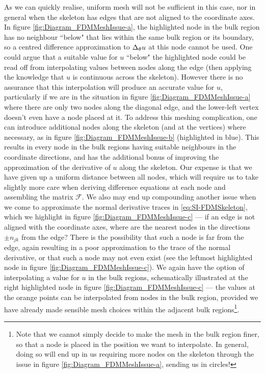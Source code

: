 As we can quickly realise, uniform mesh will not be sufficient in this case, nor in general when the skeleton has edges that are not aligned to the coordinate axes. 
In figure \ref{fig:Diagram_FDMMeshIssue-a}, the highlighted node in the bulk region has no neighbour ``below" that lies within the same bulk region or its boundary, so a centred difference approximation to $\Delta_{\theta}u$ at this node cannot be used.
One could argue that a suitable value for $u$ ``below" the highlighted node could be read off from interpolating values between nodes along the edge (then applying the knowledge that $u$ is continuous across the skeleton).
However there is no assurance that this interpolation will produce an accurate value for $u$, particularly if we are in the situation in figure \ref{fig:Diagram_FDMMeshIssue-a} where there are only two nodes along the diagonal edge, and the lower-left vertex doesn't even have a node placed at it.
To address this meshing complication, one can introduce additional nodes along the skeleton (and at the vertices) where necessary, as in figure \ref{fig:Diagram_FDMMeshIssue-b} (highlighted in blue).
This results in every node in the bulk regions having suitable neighbours in the coordinate directions, and has the additional bonus of improving the approximation of the derivative of $u$ along the skeleton.
Our expense is that we have given up a uniform distance between all nodes, which will require us to take slightly more care when deriving difference equations at each node and assembling the matrix $\mathcal{F}$.
We also may end up compounding another issue when we come to approximate the normal derivative traces in \eqref{eq:SI-FDMSkeleton}, which we highlight in figure \ref{fig:Diagram_FDMMeshIssue-c} --- if an edge is not aligned with the coordinate axes, where are the nearest nodes in the directions $\pm n_{jk}$ from the edge?
There is the possibility that such a node is far from the edge, again resulting in a poor approximation to the trace of the normal derivative, or that such a node may not even exist (see the leftmost highlighted node in figure \ref{fig:Diagram_FDMMeshIssue-c}).
We again have the option of interpolating a value for $u$ in the bulk regions, schematically illustrated at the right highlighted node in figure \ref{fig:Diagram_FDMMeshIssue-c} --- the values at the orange points can be interpolated from nodes in the bulk region, provided we have already made sensible mesh choices within the adjacent bulk regions\footnote{Note that we cannot simply decide to make the mesh in the bulk region finer, so that a node is placed in the position we want to interpolate. In general, doing so will end up in us requiring more nodes on the skeleton through the issue in figure \ref{fig:Diagram_FDMMeshIssue-a}, sending us in circles!}.
